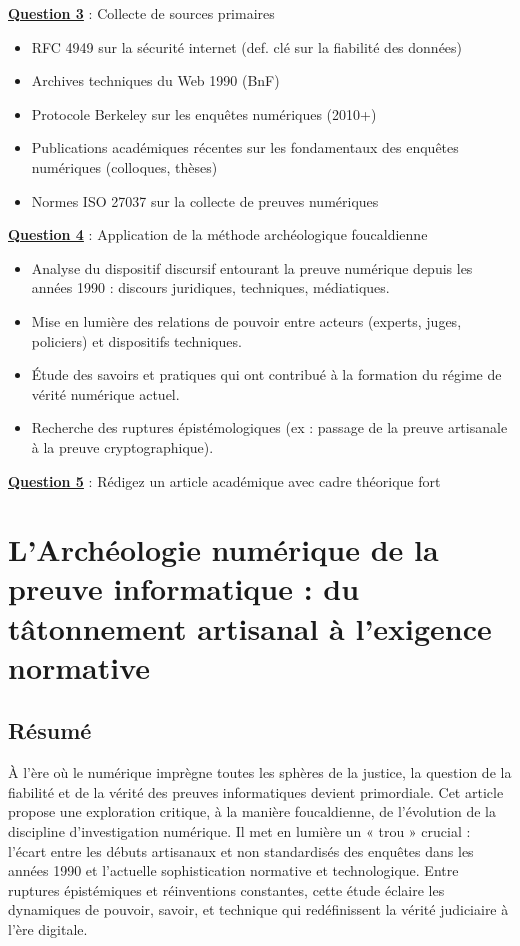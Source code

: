 \documentclass[12pt, a4paper]{article}
\newcommand{\question}[1]{\textbf{\underline{Question #1}}}
\begin{document}
\begin{enumerate}[label=\textbf{\arabic*.}, start=6]
		\question{3} : Collecte de sources primaires
		
		\begin{itemize}
			\item RFC 4949 sur la sécurité internet (def. clé sur la fiabilité des données)
			\item Archives techniques du Web 1990 (BnF)
			\item Protocole Berkeley sur les enquêtes numériques (2010+)
			\item Publications académiques récentes sur les fondamentaux des enquêtes numériques (colloques, thèses)
			\item Normes ISO 27037 sur la collecte de preuves numériques
		\end{itemize}
		
		\question{4} : Application de la méthode archéologique foucaldienne
		
		\begin{itemize}
			\item Analyse du dispositif discursif entourant la preuve numérique depuis les années 1990 : discours juridiques, techniques, médiatiques.
			\item Mise en lumière des relations de pouvoir entre acteurs (experts, juges, policiers) et dispositifs techniques.
			\item Étude des savoirs et pratiques qui ont contribué à la formation du régime de vérité numérique actuel.
			\item Recherche des ruptures épistémologiques (ex : passage de la preuve artisanale à la preuve cryptographique).
		\end{itemize}
		
		\question{5} : Rédigez un article académique avec cadre théorique fort
		
		\section*{L'Archéologie numérique de la preuve informatique : du tâtonnement artisanal à l'exigence normative}
		
		\subsection*{Résumé}
		
		À l'ère où le numérique imprègne toutes les sphères de la justice, la question de la fiabilité et de la vérité des preuves informatiques devient primordiale. Cet article propose une exploration critique, à la manière foucaldienne, de l'évolution de la discipline d'investigation numérique. Il met en lumière un « trou » crucial : l'écart entre les débuts artisanaux et non standardisés des enquêtes dans les années 1990 et l'actuelle sophistication normative et technologique. Entre ruptures épistémiques et réinventions constantes, cette étude éclaire les dynamiques de pouvoir, savoir, et technique qui redéfinissent la vérité judiciaire à l'ère digitale.
		

\end{enumerate}
\end{document}

